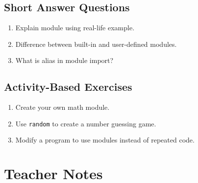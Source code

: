 \subsection{Short Answer Questions}

\begin{enumerate}
    \item Explain module using real-life example.
    \item Difference between built-in and user-defined modules.
    \item What is alias in module import?
\end{enumerate}

\subsection{Activity-Based Exercises}

\begin{enumerate}
    \item Create your own math module.
    \item Use \texttt{random} to create a number guessing game.
    \item Modify a program to use modules instead of repeated code.
\end{enumerate}

\section{Teacher Notes}

